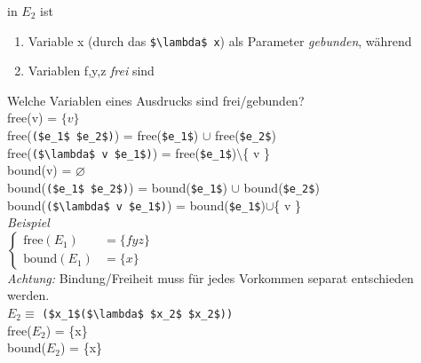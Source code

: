 in $E_2$ ist
\begin{enumerate}[-]
\item Variable x (durch das \lstinline[mathescape]|$\lambda$ x|) als Parameter \emph{gebunden}, während
\item Variablen f,y,z \emph{frei} sind
\end{enumerate}
Welche Variablen eines Ausdrucks sind frei/gebunden?\\
free(v) = $\{v\}$\\
free(\lstinline[mathescape]|($e_1$ $e_2$)|) = free(\lstinline[mathescape]|$e_1$|) $\cup$ free(\lstinline[mathescape]|$e_2$|)\\
free(\lstinline[mathescape]|($\lambda$ v $e_1$)|) = free(\lstinline[mathescape]|$e_1$|)$\setminus$\{ v \}\\
bound(v) = $\varnothing$\\
bound(\lstinline[mathescape]|($e_1$ $e_2$)|) = bound(\lstinline[mathescape]|$e_1$|) $\cup$ bound(\lstinline[mathescape]|$e_2$|)\\
bound(\lstinline[mathescape]|($\lambda$ v $e_1$)|) = bound(\lstinline[mathescape]|$e_1$|)$\cup$\{ v \}\\
\emph{Beispiel}\\
$\begin{cases}
\text{free}(E_1) &= \{fyz\}\\
\text{bound}(E_1)&= \{x\}
\end{cases}$\\
\emph{Achtung:}
Bindung/Freiheit muss für jedes Vorkommen separat entschieden werden.\\
$E_2\equiv$ \lstinline[mathescape]|($x_1$($\lambda$ $x_2$ $x_2$))|\\
free($E_2$) = \{x\}\\
bound($E_2$) = \{x\}
